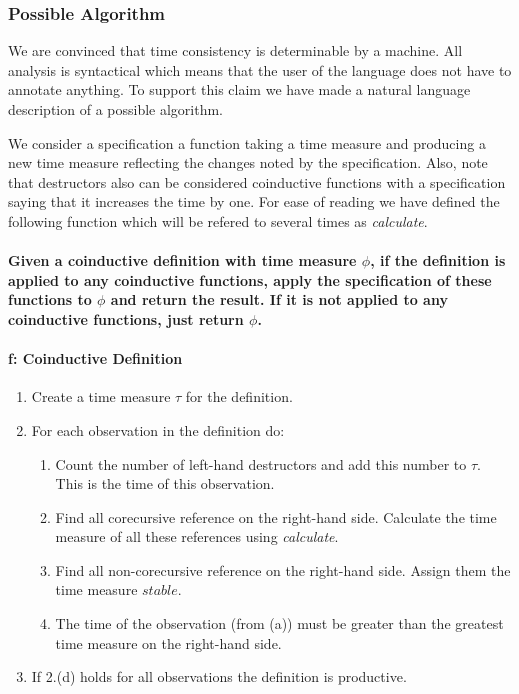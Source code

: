 \subsubsection{Possible Algorithm}
We are convinced that time consistency is determinable by a machine. All analysis is syntactical which means that the user of the language does not have to annotate anything. To support this claim we have made a natural language description of a possible algorithm. 

We consider a specification a function taking a time measure and producing a new time measure reflecting the changes noted by the specification. Also, note that destructors also can be considered coinductive functions with a specification saying that it increases the time by one. For ease of reading we have defined the following function which will be refered to several times as \textit{calculate}.

\paragraph{
Given a coinductive definition with time measure $\phi$, if the definition is applied to any coinductive functions, apply the specification of these functions to $\phi$ and return the result. If it is not applied to any coinductive functions, just return $\phi$.}
\paragraph{f: Coinductive Definition}
\begin{enumerate}
\item Create a time measure $\tau$ for the definition.
\item For each observation in the definition do:
\begin{enumerate}
\item Count the number of left-hand destructors and add this number to $\tau$. This is the time of this observation. 
\item Find all corecursive reference on the right-hand side. Calculate the time measure of all these references using \textit{calculate}.
\item Find all non-corecursive reference on the right-hand side. Assign them the time measure $stable$.
\item The time of the observation (from (a)) must be greater than the greatest time measure on the right-hand side.
\end{enumerate}
\item If 2.(d) holds for all observations the definition is productive.
\end{enumerate}


